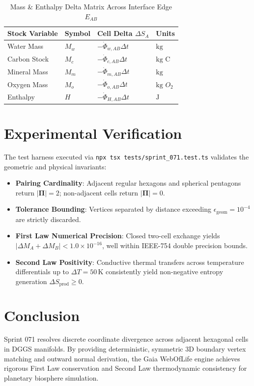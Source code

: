 \documentclass[10pt,journal,compsoc]{IEEEtran}
\begin{document}
\begin{table}[htbp]
\caption{Mass \& Enthalpy Delta Matrix Across Interface Edge $E_{AB}$}
\begin{center}
\begin{tabular}{@{}llll@{}}
\toprule
\textbf{Stock Variable} & \textbf{Symbol} & \textbf{Cell Delta $\Delta S_A$} & \textbf{Units} \\
\midrule
Water Mass & $M_w$ & $-\dot{\Phi}_{w, AB} \Delta t$ & $\text{kg}$ \\
Carbon Stock & $M_c$ & $-\dot{\Phi}_{c, AB} \Delta t$ & $\text{kg C}$ \\
Mineral Mass & $M_m$ & $-\dot{\Phi}_{m, AB} \Delta t$ & $\text{kg}$ \\
Oxygen Mass & $M_o$ & $-\dot{\Phi}_{o, AB} \Delta t$ & $\text{kg } O_2$ \\
Enthalpy & $H$ & $-\dot{\Phi}_{H, AB} \Delta t$ & $\text{J}$ \\
\bottomrule
\end{tabular}
\end{center}
\label{tab:deltas}
\end{table}

\section{Experimental Verification}
The test harness executed via \texttt{npx tsx tests/sprint\_071.test.ts} validates the geometric and physical invariants:
\begin{itemize}
    \item \textbf{Pairing Cardinality}: Adjacent regular hexagons and spherical pentagons return $|\mathbf{\Pi}| = 2$; non-adjacent cells return $|\mathbf{\Pi}| = 0$.
    \item \textbf{Tolerance Bounding}: Vertices separated by distance exceeding $\epsilon_{\text{geom}} = 10^{-4}$ are strictly discarded.
    \item \textbf{First Law Numerical Precision}: Closed two-cell exchange yields $|\Delta M_A + \Delta M_B| < 1.0 \times 10^{-16}$, well within IEEE-754 double precision bounds.
    \item \textbf{Second Law Positivity}: Conductive thermal transfers across temperature differentials up to $\Delta T = 50\,\text{K}$ consistently yield non-negative entropy generation $\Delta S_{\text{prod}} \ge 0$.
\end{itemize}

\section{Conclusion}
Sprint 071 resolves discrete coordinate divergence across adjacent hexagonal cells in DGGS manifolds. By providing deterministic, symmetric 3D boundary vertex matching and outward normal derivation, the Gaia WebOfLife engine achieves rigorous First Law conservation and Second Law thermodynamic consistency for planetary biosphere simulation.
\end{document}
